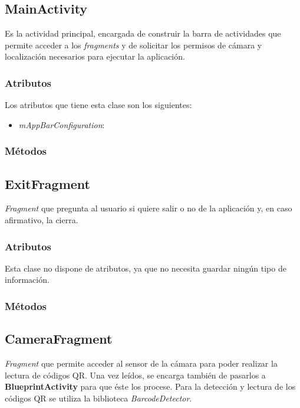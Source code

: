 \documentclass[11pt,a4paper]{article}
\begin{document}
\subsection{\textbf{MainActivity}}
\label{sec:main}

Es la actividad principal, encargada de construir la barra de actividades que permite acceder
a los \textit{fragments} y de solicitar los permisos de cámara y localización necesarios para ejecutar
la aplicación.

\subsubsection{Atributos}

Los atributos que tiene esta clase son los siguientes:

\begin{itemize}
    \item \textit{mAppBarConfiguration}: 
\end{itemize}

\subsubsection{Métodos}


\subsection{\textbf{ExitFragment}}
\label{sec:exit}

\textit{Fragment} que pregunta al usuario si quiere salir o no de la aplicación y, en caso afirmativo, la cierra.

\subsubsection{Atributos}

Esta clase no dispone de atributos, ya que no necesita guardar ningún tipo de información.

\subsubsection{Métodos}

\subsection{\textbf{CameraFragment}}
\label{sec:camera}

\textit{Fragment} que permite acceder al sensor de la cámara para poder realizar la lectura
de códigos QR. Una vez leídos, se encarga también de pasarlos a \textbf{BlueprintActivity} para que éste los procese.
Para la detección y lectura de los códigos QR se utiliza la biblioteca \textit{BarcodeDetector}.
\end{document}
